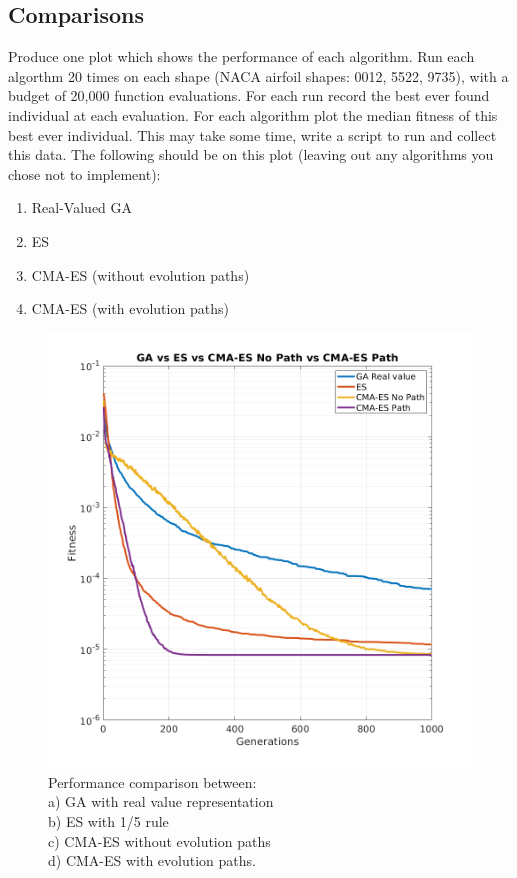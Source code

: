\documentclass{article}
\begin{document}
\subsection{Comparisons}
Produce one plot which shows the performance of each algorithm. Run each algorthm 20 times on each shape (NACA airfoil shapes: 0012, 5522, 9735), with a budget of 20,000 function evaluations. For each run record the best ever found individual at each evaluation. For each algorithm plot the median fitness of this best ever individual. This may take some time, write a script to run and collect this data. The following should be on this plot (leaving out any algorithms you chose not to implement):
\begin{enumerate}
	\item Real-Valued GA
	\item ES
	\item CMA-ES (without evolution paths)
	\item CMA-ES (with evolution paths)
\end{enumerate}	
	\begin{figure}[h!]
		\centering
		\includegraphics[scale=0.5]{img/all_for_one.png}
		\caption{Performance comparison between:\\
			a) GA with real value representation\\
			b) ES with 1/5 rule\\
			c) CMA-ES without evolution paths\\
			d) CMA-ES with evolution paths.\label{fig:xxx1}}
	\end{figure}
\end{document}
